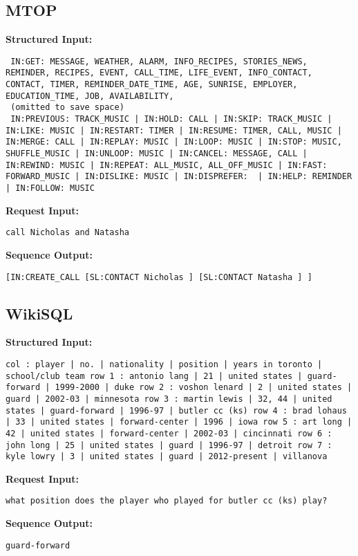 \documentclass[11pt]{article}
\begin{document}
\subsection{MTOP}
\textbf{Structured Input:} 
\begin{lstlisting}
 IN:GET: MESSAGE, WEATHER, ALARM, INFO_RECIPES, STORIES_NEWS, REMINDER, RECIPES, EVENT, CALL_TIME, LIFE_EVENT, INFO_CONTACT, CONTACT, TIMER, REMINDER_DATE_TIME, AGE, SUNRISE, EMPLOYER, EDUCATION_TIME, JOB, AVAILABILITY, 
 (omitted to save space)
 IN:PREVIOUS: TRACK_MUSIC | IN:HOLD: CALL | IN:SKIP: TRACK_MUSIC | IN:LIKE: MUSIC | IN:RESTART: TIMER | IN:RESUME: TIMER, CALL, MUSIC | IN:MERGE: CALL | IN:REPLAY: MUSIC | IN:LOOP: MUSIC | IN:STOP: MUSIC, SHUFFLE_MUSIC | IN:UNLOOP: MUSIC | IN:CANCEL: MESSAGE, CALL | IN:REWIND: MUSIC | IN:REPEAT: ALL_MUSIC, ALL_OFF_MUSIC | IN:FAST: FORWARD_MUSIC | IN:DISLIKE: MUSIC | IN:DISPREFER:  | IN:HELP: REMINDER | IN:FOLLOW: MUSIC
\end{lstlisting}
\textbf{Request Input:} 
\begin{lstlisting}
call Nicholas and Natasha
\end{lstlisting}
\textbf{Sequence Output:} 
\begin{lstlisting}
[IN:CREATE_CALL [SL:CONTACT Nicholas ] [SL:CONTACT Natasha ] ]
\end{lstlisting}

\subsection{WikiSQL}
\textbf{Structured Input:} 
\begin{lstlisting}
col : player | no. | nationality | position | years in toronto | school/club team row 1 : antonio lang | 21 | united states | guard-forward | 1999-2000 | duke row 2 : voshon lenard | 2 | united states | guard | 2002-03 | minnesota row 3 : martin lewis | 32, 44 | united states | guard-forward | 1996-97 | butler cc (ks) row 4 : brad lohaus | 33 | united states | forward-center | 1996 | iowa row 5 : art long | 42 | united states | forward-center | 2002-03 | cincinnati row 6 : john long | 25 | united states | guard | 1996-97 | detroit row 7 : kyle lowry | 3 | united states | guard | 2012-present | villanova
\end{lstlisting}
\textbf{Request Input:} 
\begin{lstlisting}
what position does the player who played for butler cc (ks) play?
\end{lstlisting}
\textbf{Sequence Output:} 
\begin{lstlisting}
guard-forward
\end{lstlisting}
\end{document}
